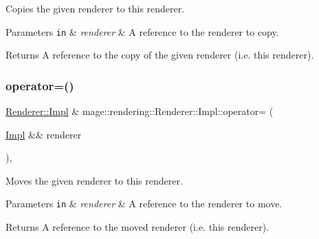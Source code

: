 Copies the given renderer to this renderer.


\begin{DoxyParams}[1]{Parameters}
\mbox{\tt in}  & {\em renderer} & A reference to the renderer to copy. \\
\hline
\end{DoxyParams}
\begin{DoxyReturn}{Returns}
A reference to the copy of the given renderer (i.\+e. this renderer). 
\end{DoxyReturn}
\mbox{\label{classmage_1_1rendering_1_1_renderer_1_1_impl_a1c40e03347062b200b3e1b214ea7b3ff}} 
\subsubsection{\texorpdfstring{operator=()}{operator=()}\hspace{0.1cm}{\footnotesize\ttfamily [2/2]}}
{\footnotesize\ttfamily \mbox{\hyperlink{classmage_1_1rendering_1_1_renderer_1_1_impl}{Renderer\+::\+Impl}} \& mage\+::rendering\+::\+Renderer\+::\+Impl\+::operator= (\begin{DoxyParamCaption}\item[{\mbox{\hyperlink{classmage_1_1rendering_1_1_renderer_1_1_impl}{Impl}} \&\&}]{renderer }\end{DoxyParamCaption})\hspace{0.3cm}{\ttfamily [default]}, {\ttfamily [noexcept]}}

Moves the given renderer to this renderer.


\begin{DoxyParams}[1]{Parameters}
\mbox{\tt in}  & {\em renderer} & A reference to the renderer to move. \\
\hline
\end{DoxyParams}
\begin{DoxyReturn}{Returns}
A reference to the moved renderer (i.\+e. this renderer). 
\end{DoxyReturn}
\mbox{\label{classmage_1_1rendering_1_1_renderer_1_1_impl_a88a8601b5fe72883788a87ba6c38b3aa}} 
